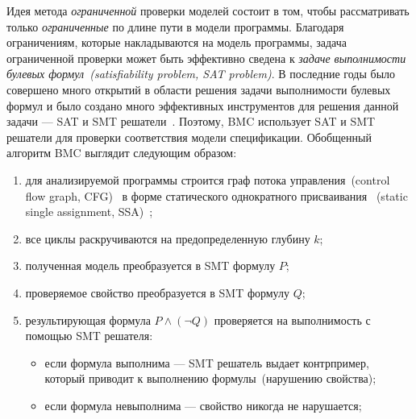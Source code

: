 Идея метода \emph{ограниченной} проверки моделей состоит в том, чтобы 
рассматривать только \emph{ограниченные} по длине пути в модели программы.
Благодаря ограничениям, которые накладываются на модель программы, задача
ограниченной проверки может быть эффективно сведена к \emph{задаче 
выполнимости булевых формул~(satisfiability problem, SAT problem)}. В 
последние годы было совершено много открытий в области решения задачи 
выполнимости булевых формул и было создано много эффективных инструментов для
решения данной задачи --- SAT и SMT решатели~\cite{sat, smt}. Поэтому, BMC 
использует SAT и SMT решатели для проверки соответствия модели спецификации.
Обобщенный алгоритм BMC выглядит следующим образом:
\begin{enumerate}
\item для анализируемой программы строится граф потока управления~(control
flow graph, CFG)~\cite{cfg} в форме статического однократного присваивания
~(static single assignment, SSA)~\cite{ssa};

\item все циклы раскручиваются на предопределенную глубину $k$;

\item полученная модель преобразуется в SMT формулу $P$;

\item проверяемое свойство преобразуется в SMT формулу $Q$;

\item результирующая формула $P \land (\neg Q)$ проверяется на выполнимость с
помощью SMT решателя:
	\begin{itemize}
	\item если формула выполнима --- SMT решатель выдает контрпример, который 
	приводит к выполнению формулы~(нарушению свойства);
	\item если формула невыполнима --- свойство никогда не нарушается;
	\end{itemize}
\end{enumerate}

